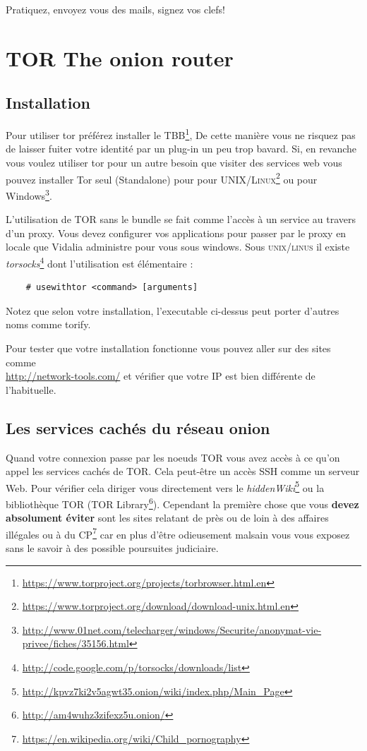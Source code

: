 \documentclass[a4paper]{article}
\begin{document}
Pratiquez, envoyez vous des mails, signez vos clefs!

\section{TOR The onion router}
\subsection{Installation}
Pour utiliser tor préférez installer le \textsc{TBB}\protect\footnote{\url{https://www.torproject.org/projects/torbrowser.html.en}},
De cette manière vous ne risquez pas de laisser fuiter votre identité par un plug-in un peu trop bavard.
Si, en revanche vous voulez utiliser tor pour un autre besoin que visiter des services web vous pouvez installer 
Tor seul (Standalone) pour pour \textsc{UNIX/Linux}\protect\footnote{\url{https://www.torproject.org/download/download-unix.html.en}}
ou pour Windows\protect\footnote{\url{http://www.01net.com/telecharger/windows/Securite/anonymat-vie-privee/fiches/35156.html}}.

L'utilisation de TOR sans le bundle se fait comme l'accès à un service au travers d'un proxy. Vous devez configurer vos applications
pour passer par le proxy en locale que Vidalia administre pour vous sous windows. Sous \textsc{unix/linus} il existe \emph{torsocks}\protect\footnote{\url{http://code.google.com/p/torsocks/downloads/list}}
dont l'utilisation est élémentaire :

\begin{verbatim}
    # usewithtor <command> [arguments]
\end{verbatim}
Notez que selon votre installation, l'executable ci-dessus peut porter d'autres noms comme torify.

Pour tester que votre installation fonctionne vous pouvez aller sur des sites comme\\
\url{http://network-tools.com/} et vérifier que votre IP est bien différente de l'habituelle.

\subsection{Les services cachés du réseau onion}
Quand votre connexion passe par les noeuds \textsc{TOR} vous avez accès à ce qu'on
appel les services cachés de \textsc{TOR}. Cela peut-être un accès SSH comme un
serveur Web. Pour vérifier cela diriger vous directement vers le
\emph{hiddenWiki}\footnote{\url{http://kpvz7ki2v5agwt35.onion/wiki/index.php/Main_Page}}
ou la bibliothèque TOR (TOR Library\footnote{\url{http://am4wuhz3zifexz5u.onion/}}).
Cependant la première chose que vous \textbf{devez absolument éviter} sont les sites relatant de
près ou de loin à des affaires illégales ou à du CP\protect\footnote{\url{https://en.wikipedia.org/wiki/Child_pornography}}
car en plus d'être odieusement malsain vous vous exposez sans le savoir à des possible poursuites judiciaire.
\\
\end{document}
